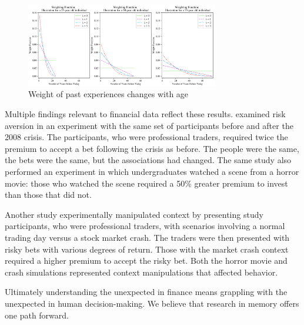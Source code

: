 \begin{figure}[h]
    \centering
    \includegraphics[width=0.75\textwidth]{fig18.png}
    \caption{Weight of past experiences changes with age \citep{malmendier2021memory}}
    \label{fig:fig18}
\end{figure}

Multiple findings relevant to financial data reflect these results. \citet{guiso2018time} examined risk aversion in an experiment with the same set of participants before and after the 2008 crisis. The participants, who were professional traders, required twice the premium to accept a bet following the crisis as before. The people were the same, the bets were the same, but the associations had changed. The same study also performed an experiment in which undergraduates watched a scene from a horror movie: those who watched the scene required a 50\% greater premium to invest than those that did not. 

Another study \citep{cohn2015evidence} experimentally manipulated context by presenting study participants, who were professional traders, with scenarios involving a normal trading day versus a stock market crash. The traders were then presented with risky bets with various degrees of return. Those with the market crash context required a higher premium to accept the risky bet. Both the horror movie and crash simulations represented context manipulations that affected behavior.  
 
Ultimately understanding the unexpected in finance means grappling with the unexpected in human decision-making. We believe that research in memory offers one path forward.
